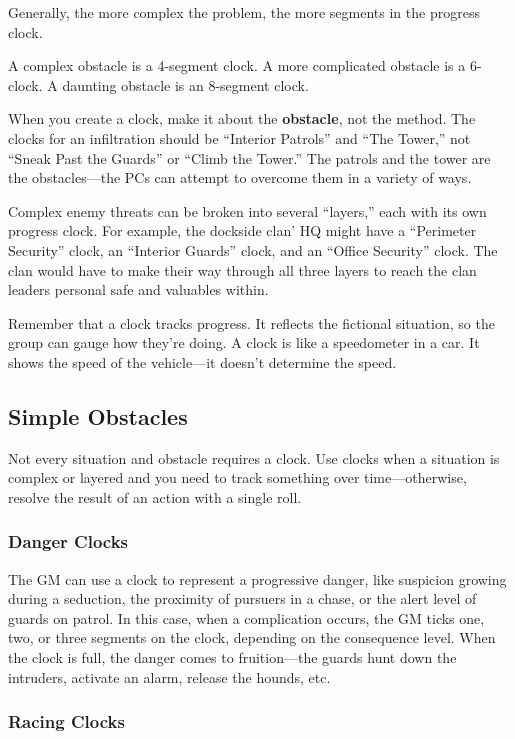 Generally, the more complex the problem, the more segments in the progress clock.

A complex obstacle is a 4-segment clock. A more complicated obstacle is a 6-clock. A daunting obstacle is an 8-segment clock.

When you create a clock, make it about the \textbf{obstacle}, not the method. The clocks for an infiltration should be ``Interior Patrols'' and ``The Tower,'' not ``Sneak Past the Guards'' or ``Climb the Tower.'' The patrols and the tower are the obstacles­—the PCs can attempt to overcome them in a variety of ways.

Complex enemy threats can be broken into several ``layers,'' each with its own progress clock. For example, the dockside clan’ HQ might have a ``Perimeter Security'' clock, an ``Interior Guards'' clock, and an ``Office Security'' clock. The clan would have to make their way through all three layers to reach the clan leaders personal safe and valuables within.

Remember that a clock tracks progress. It reflects the fictional situation, so the group can gauge how they’re doing. A clock is like a speedometer in a car. It shows the speed of the vehicle—it doesn’t determine the speed.

\subsection{Simple Obstacles}

Not every situation and obstacle requires a clock. Use clocks when a situation is complex or layered and you need to track something over time—otherwise, resolve the result of an action with a single roll.

\subsubsection{Danger Clocks}

The GM can use a clock to represent a progressive danger, like suspicion growing during a seduction, the proximity of pursuers in a chase, or the alert level of guards on patrol. In this case, when a complication occurs, the GM ticks one, two, or three segments on the clock, depending on the consequence level. When the clock is full, the danger comes to fruition—the guards hunt down the intruders, activate an alarm, release the hounds, etc.

\subsubsection{Racing Clocks}


